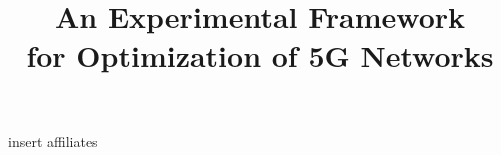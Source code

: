 \documentclass[conference]{IEEEtran}
\begin{document}
%
\title{An Experimental Framework \\for Optimization of 5G Networks}



insert affiliates



\end{document}
